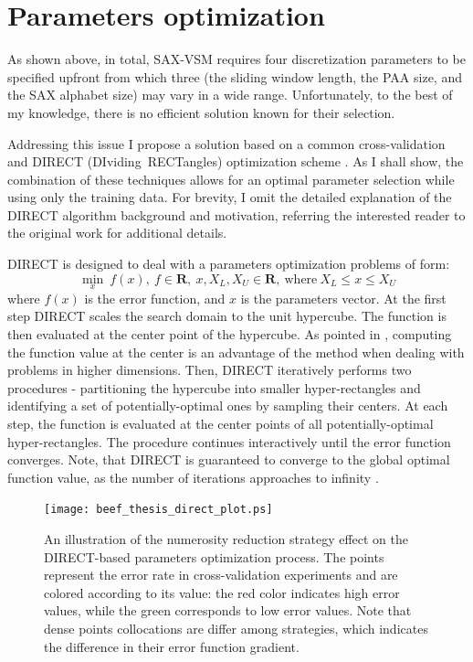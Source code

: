 \section{Parameters optimization} \label{section-direct}
As shown above, in total, SAX-VSM requires four discretization parameters to be specified upfront from which three 
(the sliding window length, the PAA size, and the SAX alphabet size) may vary in a wide range. 
Unfortunately, to the best of my knowledge, there is no efficient solution known for their selection.

Addressing this issue I propose a solution based on a common cross-validation and \mbox{DIRECT} \mbox{(DIviding RECTangles)} 
optimization scheme \cite{citeulike:4210208}. As I shall show, the combination of these techniques allows for 
an optimal parameter selection while using only the training data. For brevity, I omit the detailed explanation 
of the DIRECT algorithm background and motivation, referring the interested reader to the original work 
\cite{citeulike:12563460} for additional details.

DIRECT is designed to deal with a parameters optimization problems of form:
\begin{equation}
 \min_{x} \: f(x), \: f \in \mathbf{R}, \: x, X_{L}, X_{U} \in \mathbf{R}, \: \text{where} \: X_{L} \leq x \leq X_{U}
 \label{formula:direct}
\end{equation} 
where $f(x)$ is the error function, and $x$ is the parameters vector.
At the first step DIRECT scales the search domain to the unit hypercube. The function is then evaluated 
at the center point of the hypercube. As pointed in \cite{citeulike:12563460}, computing the function value
at the center is an advantage of the method when dealing with problems
in higher dimensions.
Then, DIRECT iteratively performs two procedures - partitioning the hypercube into smaller hyper-rectangles 
and identifying a set of potentially-optimal ones by sampling their centers. At each step, the function is evaluated 
at the center points of all potentially-optimal hyper-rectangles. The procedure continues interactively until the 
error function converges. Note, that DIRECT is guaranteed to converge to the global optimal function value,
as the number of iterations approaches to infinity \cite{citeulike:12563460}.

\begin{figure}[!t]
   \centering
   \texttt{[image: beef\_thesis\_direct\_plot.ps]}
   \caption{
   An illustration of the numerosity reduction strategy effect on the DIRECT-based parameters optimization process. 
   The points represent the error rate in cross-validation experiments and are colored according to its value: 
   the red color indicates high error values, while the green corresponds to low error values. 
   Note that dense points collocations are differ among strategies, which indicates the difference in their error 
   function gradient.
   }
   \label{fig:sax_nr}
\end{figure}

